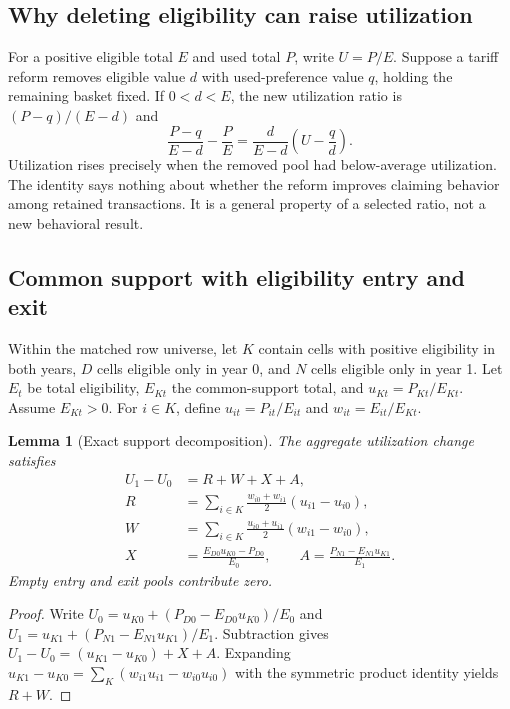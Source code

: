 \documentclass[11pt,a4paper]{article}
\newtheorem{lemma}{Lemma}
\begin{document}
\subsection{Why deleting eligibility can raise utilization}
For a positive eligible total $E$ and used total $P$, write $U=P/E$. Suppose a tariff reform removes eligible value $d$ with used-preference value $q$, holding the remaining basket fixed. If $0<d<E$, the new utilization ratio is $(P-q)/(E-d)$ and
\begin{equation}
 \frac{P-q}{E-d}-\frac PE
 =\frac{d}{E-d}\left(U-\frac qd\right).
 \label{eq:deletion}
\end{equation}
Utilization rises precisely when the removed pool had below-average utilization. The identity says nothing about whether the reform improves claiming behavior among retained transactions. It is a general property of a selected ratio, not a new behavioral result.

\subsection{Common support with eligibility entry and exit}
Within the matched row universe, let $K$ contain cells with positive eligibility in both years, $D$ cells eligible only in year 0, and $N$ cells eligible only in year 1. Let $E_t$ be total eligibility, $E_{Kt}$ the common-support total, and $u_{Kt}=P_{Kt}/E_{Kt}$. Assume $E_{Kt}>0$. For $i\in K$, define $u_{it}=P_{it}/E_{it}$ and $w_{it}=E_{it}/E_{Kt}$.

\begin{lemma}[Exact support decomposition]
The aggregate utilization change satisfies
\begin{align}
 U_1-U_0 &= R+W+X+A,\label{eq:split}\\
 R&=\sum_{i\in K}\frac{w_{i0}+w_{i1}}2(u_{i1}-u_{i0}),\label{eq:rate}\\
 W&=\sum_{i\in K}\frac{u_{i0}+u_{i1}}2(w_{i1}-w_{i0}),\\
 X&=\frac{E_{D0}u_{K0}-P_{D0}}{E_0},\qquad
 A=\frac{P_{N1}-E_{N1}u_{K1}}{E_1}.\label{eq:support}
\end{align}
Empty entry and exit pools contribute zero.
\end{lemma}
\begin{proof}
Write $U_0=u_{K0}+(P_{D0}-E_{D0}u_{K0})/E_0$ and $U_1=u_{K1}+(P_{N1}-E_{N1}u_{K1})/E_1$. Subtraction gives $U_1-U_0=(u_{K1}-u_{K0})+X+A$. Expanding $u_{K1}-u_{K0}=\sum_K(w_{i1}u_{i1}-w_{i0}u_{i0})$ with the symmetric product identity yields $R+W$.
\end{proof}
\end{document}
